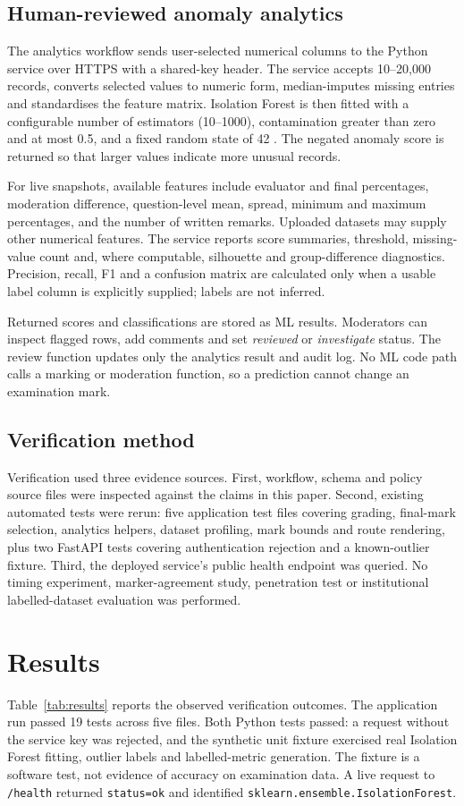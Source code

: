 \documentclass[conference]{IEEEtran}
\begin{document}
\subsection{Human-reviewed anomaly analytics}
The analytics workflow sends user-selected numerical columns to the Python service over HTTPS with a shared-key header. The service accepts 10--20{,}000 records, converts selected values to numeric form, median-imputes missing entries and standardises the feature matrix. Isolation Forest is then fitted with a configurable number of estimators (10--1000), contamination greater than zero and at most 0.5, and a fixed random state of 42 \cite{liu2008}. The negated anomaly score is returned so that larger values indicate more unusual records.

For live snapshots, available features include evaluator and final percentages, moderation difference, question-level mean, spread, minimum and maximum percentages, and the number of written remarks. Uploaded datasets may supply other numerical features. The service reports score summaries, threshold, missing-value count and, where computable, silhouette and group-difference diagnostics. Precision, recall, F1 and a confusion matrix are calculated only when a usable label column is explicitly supplied; labels are not inferred.

Returned scores and classifications are stored as ML results. Moderators can inspect flagged rows, add comments and set \emph{reviewed} or \emph{investigate} status. The review function updates only the analytics result and audit log. No ML code path calls a marking or moderation function, so a prediction cannot change an examination mark.

\subsection{Verification method}
Verification used three evidence sources. First, workflow, schema and policy source files were inspected against the claims in this paper. Second, existing automated tests were rerun: five application test files covering grading, final-mark selection, analytics helpers, dataset profiling, mark bounds and route rendering, plus two FastAPI tests covering authentication rejection and a known-outlier fixture. Third, the deployed service's public health endpoint was queried. No timing experiment, marker-agreement study, penetration test or institutional labelled-dataset evaluation was performed.

\section{Results}
Table~\ref{tab:results} reports the observed verification outcomes. The application run passed 19 tests across five files. Both Python tests passed: a request without the service key was rejected, and the synthetic unit fixture exercised real Isolation Forest fitting, outlier labels and labelled-metric generation. The fixture is a software test, not evidence of accuracy on examination data. A live request to \texttt{/health} returned \texttt{status=ok} and identified \texttt{sklearn.ensemble.IsolationForest}.
\end{document}

